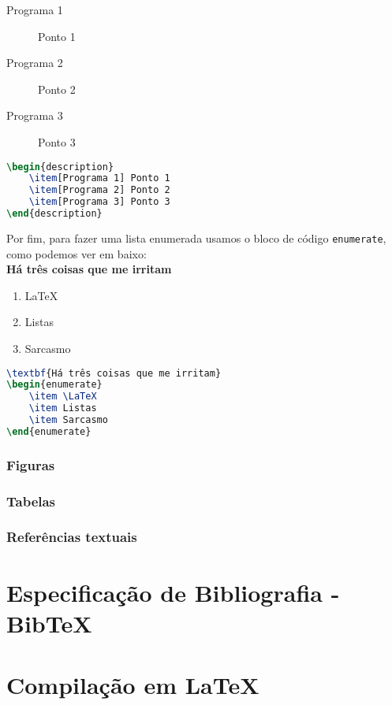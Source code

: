 \documentclass[a4paper, onecolumn, 10pt]{report}
\begin{document}
\begin{description}
    \item[Programa 1] Ponto 1
    \item[Programa 2] Ponto 2
    \item[Programa 3] Ponto 3
\end{description}

\begin{lstlisting}[language=TeX]
\begin{description}
    \item[Programa 1] Ponto 1
    \item[Programa 2] Ponto 2
    \item[Programa 3] Ponto 3
\end{description}
\end{lstlisting}

Por fim, para fazer uma lista enumerada usamos o bloco de código \texttt{enumerate}, como podemos ver em baixo:\\

\textbf{Há três coisas que me irritam}
\begin{enumerate}
    \item \LaTeX
    \item Listas
    \item Sarcasmo
\end{enumerate}

\begin{lstlisting}[language=TeX]
\textbf{Há três coisas que me irritam}
\begin{enumerate}
    \item \LaTeX
    \item Listas
    \item Sarcasmo
\end{enumerate}
\end{lstlisting}

\subsection{Figuras}

\subsection{Tabelas}

\subsection{Referências textuais}

\chapter{Especificação de Bibliografia - Bib\TeX}

\chapter{Compilação em \LaTeX}

\tableofcontents

\newpage

\printacronyms[include-classes=abbrev, name=Acrónimos]
\end{document}
